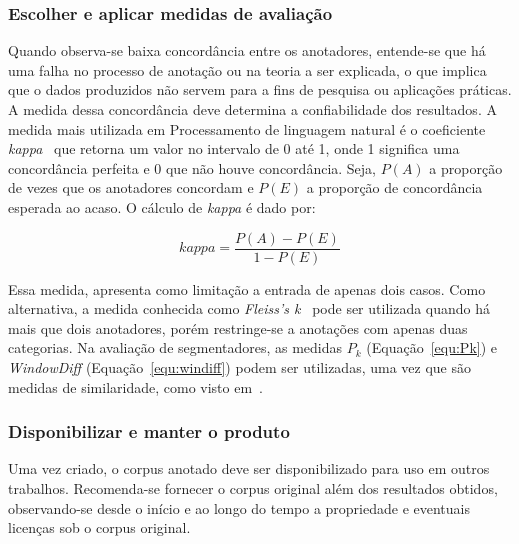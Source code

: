 \subsubsection{Escolher e aplicar medidas de avaliação}

Quando observa-se baixa concordância entre os anotadores, entende-se que há uma falha no processo de anotação ou na teoria a ser explicada, o que implica que o dados produzidos não servem para a fins de pesquisa ou aplicações práticas. A medida dessa concordância deve determina a confiabilidade dos resultados.
A medida mais utilizada em Processamento de linguagem natural é o coeficiente \textit{kappa}~\cite{Carletta1996} que retorna um valor no intervalo de 0 até 1, onde 1 significa uma concordância perfeita e 0 que não houve concordância. Seja, $P(A)$ a proporção de vezes que os anotadores concordam e $P(E)$ a proporção de concordância esperada ao acaso. O cálculo de \textit{kappa} é dado por:

\begin{equation}
	kappa = \frac{P(A) - P(E)}{1 - P(E)}
\end{equation}

Essa medida, apresenta como limitação a entrada de apenas dois casos. Como alternativa, a medida conhecida como \textit{Fleiss's k}~\cite{Fleiss1979} pode ser utilizada quando há mais que dois anotadores, porém restringe-se a anotações com apenas duas categorias. 
Na avaliação de segmentadores, as medidas $P_k$ (Equação~\ref{equ:Pk}) e \textit{WindowDiff} (Equação~\ref{equ:windiff}) podem ser utilizadas, uma vez que são medidas de similaridade, como visto em~\cite{Kazantseva2012,Cardoso2017}.



\subsubsection{Disponibilizar e manter o produto}

Uma vez criado, o corpus anotado deve ser disponibilizado para uso em outros trabalhos. 
Recomenda-se fornecer o corpus original além dos resultados obtidos, observando-se desde o início e ao longo do tempo a propriedade e eventuais licenças sob o corpus original.




